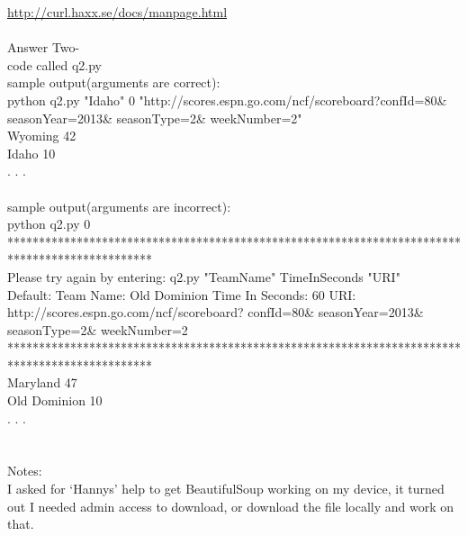 \documentclass[11pt]{article}
\begin{document}
\url{http://curl.haxx.se/docs/manpage.html}\\
\pagebreak
\\
Answer Two-\\
code called q2.py\\
sample output(arguments are correct):\\
python q2.py "Idaho" 0 "http://scores.espn.go.com/ncf/scoreboard?confId=80\& seasonYear=2013\& seasonType=2\& weekNumber=2"\\
Wyoming 42\\
Idaho 10\\
. . .\\
\\
sample output(arguments are incorrect):\\
python q2.py 0\\
***********************************************************************************************\\
Please try again by entering: q2.py "TeamName" TimeInSeconds "URI"\\
\indexspace Default:
\indexspace Team Name: Old Dominion
\indexspace Time In Seconds: 60
\indexspace URI: http://scores.espn.go.com/ncf/scoreboard? confId=80\& seasonYear=2013\& seasonType=2\& weekNumber=2\\
***********************************************************************************************\\
Maryland 47\\
Old Dominion 10\\
. . .\\
\\
\\
Notes:\\
I asked for ‘Hannys’ help to get BeautifulSoup working on my device, it turned out I needed admin access to download, or download the file locally and work on that. \\
\end{document}
